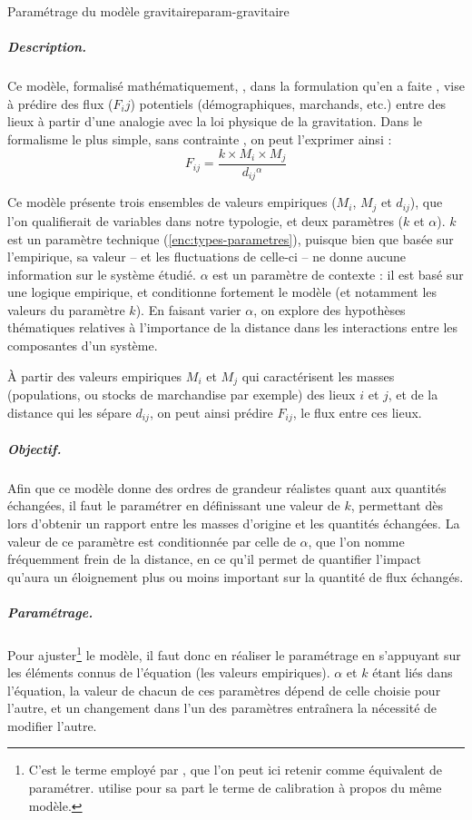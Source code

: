 \begin{encadre}{Paramétrage du modèle gravitaire}{param-gravitaire}
	\renewcommand{\thempfootnote}{\alph{mpfootnote}}
\subparagraph{Description.}
Ce modèle, formalisé mathématiquement,
, dans la formulation qu'en a faite \textcite{stewart_demographic_1948}, vise à prédire des flux ($F_ij$) potentiels (démographiques, marchands, etc.) entre des lieux à partir d'une analogie avec la loi physique de la gravitation.
Dans le formalisme le plus simple, \og sans contrainte\fg{} \autocite{pumain_les_2001}, on peut l'exprimer ainsi :
\vspace*{-.5em}
\begin{equation*}
F_{ij} = \frac{k \times M_{i} \times M_{j}}{d_{ij}{}^\alpha}
\end{equation*}

\vspace*{-.75em}Ce modèle présente trois ensembles de valeurs empiriques ($M_i$, $M_j$ et $d_{ij}$), que l'on qualifierait de variables dans notre typologie, et deux paramètres ($k$ et $\alpha$).
$k$ est un paramètre technique (\cref{enc:types-parametres}), puisque bien que basée sur l'empirique, sa valeur -- et les fluctuations de celle-ci -- ne donne aucune information sur le système étudié.
$\alpha$ est un paramètre de contexte : il est basé sur une logique empirique, et conditionne fortement le modèle (et notamment les valeurs du paramètre $k$).
En faisant varier $\alpha$, on explore des hypothèses thématiques relatives à l'importance de la distance dans les interactions entre les composantes d'un système.

À partir des valeurs empiriques $M_i$ et $M_j$ qui caractérisent les masses (populations, ou stocks de  marchandise par exemple) des lieux $i$ et $j$, et de la distance qui les sépare $d_{ij}$, on peut ainsi prédire $F_{ij}$, le flux entre ces lieux.

\subparagraph{Objectif.}
Afin que ce modèle donne des ordres de grandeur réalistes quant aux quantités échangées, il faut le paramétrer en définissant une valeur de $k$, permettant dès lors d'obtenir un rapport entre les masses d'origine et les quantités échangées.
La valeur de ce paramètre est conditionnée par celle de $\alpha$, que l'on nomme fréquemment \og frein de la distance\fg{}, en ce qu'il permet de quantifier l'impact qu'aura un éloignement plus ou moins important sur la quantité de flux échangés.

\subparagraph{Paramétrage.}
Pour \og ajuster\fg{}\footnote{
	C'est le terme employé par \textcite{pumain_les_2001}, que l'on peut ici retenir comme équivalent de paramétrer.
	\textcite[298]{durand1995modeles} utilise pour sa part le terme de calibration à propos du même modèle.
} le modèle, il faut donc en réaliser le paramétrage en s'appuyant sur les éléments connus de l'équation (les valeurs empiriques).
$\alpha$ et $k$ étant liés dans l'équation, la valeur de chacun de ces paramètres dépend de celle choisie pour l'autre, et un changement dans l'un des paramètres entraînera la nécessité de modifier l'autre.


\end{encadre}

